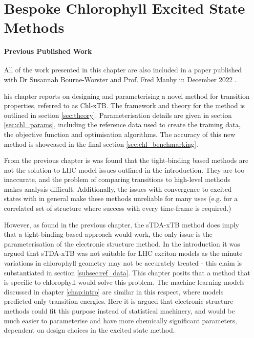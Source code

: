 %
%
\let\textcircled=\pgftextcircled
\chapter{Bespoke Chlorophyll Excited State Methods}
\label{chap:chl_xtb}

\subsubsection*{Previous Published Work}
All of the work presented in this chapter are also included in a paper published 
with Dr Susannah Bourne-Worster and Prof. Fred Manby in December 2022 \cite{Feighan2023}.

his chapter reports on designing and parameterising a novel method for
transition properties, referred to as Chl-xTB. The framework and theory for the method
is outlined in section \ref{sec:theory}. Parameterisation details are given in section \ref{sec:chl_params},
including the reference data used to create the training data, the objective function
and optimisation algorithms. The accuracy of this new method is showcased in the
final section \ref{sec:chl_benchmarking}.

From the previous chapter is was found that the tight-binding based \dxtb methods
are not the solution to LHC model issues outlined in the introduction. They are
too inaccurate, and the problem of comparing transitions to high-level methods makes
analysis difficult. Additionally, the issues with convergence to excited states 
with \dscf in general make these methods unreliable for many uses (e.g. for a correlated
set of structure where success with every time-frame is required.)

However, as found in the previous chapter, the sTDA-xTB method does imply that a 
tight-binding based approach would work, the only issue is the parameterisation of
the electronic structure method. In the introduction it was argued that sTDA-xTB
was not suitable for LHC exciton models as the minute variations in chlorophyll 
geometry may not be accurately treated - this claim is substantiated in section \ref{subsec:ref_data}.
This chapter posits that a method that is specific to chlorophyll would solve this
problem. The machine-learning models discussed in chapter \ref{chap:intro} are similar
in this respect, where models predicted only \Qy transition energies. Here it is
argued that electronic structure methods could fit this purpose instead of statistical
machinery, and would be much easier to parameterise and have more chemically significant
parameters, dependent on design choices in the excited state method. 

